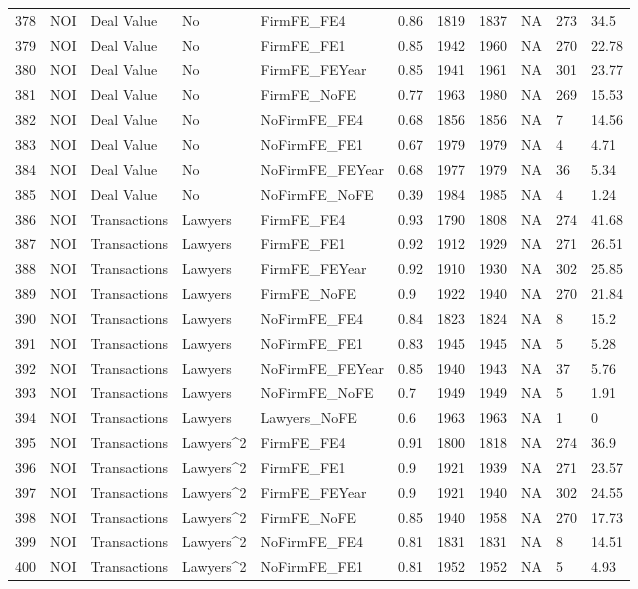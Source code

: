 \documentclass{article}
\begin{document}
\begin{table}[H]
\begin{tabular}{rllllllllll}
  378 & NOI & Deal Value & No & FirmFE\_FE4 & 0.86 & 1819 & 1837 & NA & 273 & 34.5 \\ 
  379 & NOI & Deal Value & No & FirmFE\_FE1 & 0.85 & 1942 & 1960 & NA & 270 & 22.78 \\ 
  380 & NOI & Deal Value & No & FirmFE\_FEYear & 0.85 & 1941 & 1961 & NA & 301 & 23.77 \\ 
  381 & NOI & Deal Value & No & FirmFE\_NoFE & 0.77 & 1963 & 1980 & NA & 269 & 15.53 \\ 
  382 & NOI & Deal Value & No & NoFirmFE\_FE4 & 0.68 & 1856 & 1856 & NA & 7 & 14.56 \\ 
  383 & NOI & Deal Value & No & NoFirmFE\_FE1 & 0.67 & 1979 & 1979 & NA & 4 & 4.71 \\ 
  384 & NOI & Deal Value & No & NoFirmFE\_FEYear & 0.68 & 1977 & 1979 & NA & 36 & 5.34 \\ 
  385 & NOI & Deal Value & No & NoFirmFE\_NoFE & 0.39 & 1984 & 1985 & NA & 4 & 1.24 \\ 
  386 & NOI & Transactions & Lawyers & FirmFE\_FE4 & 0.93 & 1790 & 1808 & NA & 274 & 41.68 \\ 
  387 & NOI & Transactions & Lawyers & FirmFE\_FE1 & 0.92 & 1912 & 1929 & NA & 271 & 26.51 \\ 
  388 & NOI & Transactions & Lawyers & FirmFE\_FEYear & 0.92 & 1910 & 1930 & NA & 302 & 25.85 \\ 
  389 & NOI & Transactions & Lawyers & FirmFE\_NoFE & 0.9 & 1922 & 1940 & NA & 270 & 21.84 \\ 
  390 & NOI & Transactions & Lawyers & NoFirmFE\_FE4 & 0.84 & 1823 & 1824 & NA & 8 & 15.2 \\ 
  391 & NOI & Transactions & Lawyers & NoFirmFE\_FE1 & 0.83 & 1945 & 1945 & NA & 5 & 5.28 \\ 
  392 & NOI & Transactions & Lawyers & NoFirmFE\_FEYear & 0.85 & 1940 & 1943 & NA & 37 & 5.76 \\ 
  393 & NOI & Transactions & Lawyers & NoFirmFE\_NoFE & 0.7 & 1949 & 1949 & NA & 5 & 1.91 \\ 
  394 & NOI & Transactions & Lawyers & Lawyers\_NoFE & 0.6 & 1963 & 1963 & NA & 1 & 0 \\ 
  395 & NOI & Transactions & Lawyers^2 & FirmFE\_FE4 & 0.91 & 1800 & 1818 & NA & 274 & 36.9 \\ 
  396 & NOI & Transactions & Lawyers^2 & FirmFE\_FE1 & 0.9 & 1921 & 1939 & NA & 271 & 23.57 \\ 
  397 & NOI & Transactions & Lawyers^2 & FirmFE\_FEYear & 0.9 & 1921 & 1940 & NA & 302 & 24.55 \\ 
  398 & NOI & Transactions & Lawyers^2 & FirmFE\_NoFE & 0.85 & 1940 & 1958 & NA & 270 & 17.73 \\ 
  399 & NOI & Transactions & Lawyers^2 & NoFirmFE\_FE4 & 0.81 & 1831 & 1831 & NA & 8 & 14.51 \\ 
  400 & NOI & Transactions & Lawyers^2 & NoFirmFE\_FE1 & 0.81 & 1952 & 1952 & NA & 5 & 4.93 \\ 
   \hline
\end{tabular}
\end{table}
\end{document}
